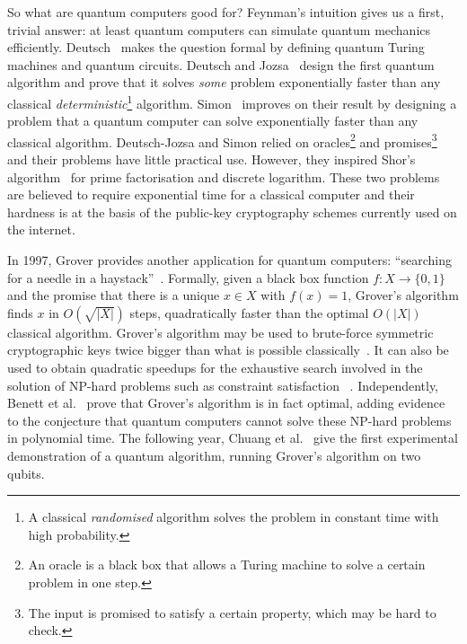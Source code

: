 So what are quantum computers good for? Feynman's intuition gives us a
first, trivial answer: at least quantum computers can simulate quantum
mechanics efficiently. Deutsch~\cite{Deutsch85a} makes the question formal by
defining quantum Turing machines and quantum circuits.
Deutsch and Jozsa~\cite{DeutschJozsa92}
design the first quantum algorithm and prove that it solves
\emph{some} problem exponentially faster than any classical
\emph{deterministic}\footnote
{A classical \emph{randomised} algorithm solves the
problem in constant time with high probability.} algorithm.
Simon~\cite{Simon94} improves on their result by designing a problem that a
quantum computer can solve exponentially faster than any classical
algorithm. Deutsch-Jozsa and Simon relied on
oracles\footnote{An oracle is
a black box that allows a Turing machine to solve a certain problem in one step.}
and promises\footnote
{The input is promised to satisfy a certain property, which may be hard to check.}
and their problems have little practical use. However, they inspired Shor's
algorithm~\cite{Shor94a} for prime factorisation and discrete logarithm. These
two problems are believed to require exponential time for a classical
computer and their hardness is at the basis of the public-key
cryptography schemes currently used on the internet.

In 1997, Grover provides another application for quantum computers:
``searching for a needle in a haystack''~\cite{Grover97}. Formally,
given a black box function $f : X \to \{0, 1\}$ and the promise that
there is a unique $x \in X$ with $f(x) = 1$, Grover's algorithm finds
$x$ in $O(\sqrt{|X|})$ steps, quadratically faster than the optimal
$O(|X|)$ classical algorithm. Grover's algorithm may be used to
brute-force symmetric cryptographic keys twice bigger than what is
possible classically~\cite{BernsteinEtAl09}. It can also be used to
obtain quadratic speedups for the exhaustive search involved in the
solution of NP-hard problems such as constraint satisfaction
~\cite{Ambainis04}. Independently, Benett et al.~\cite{BennettEtAl97}
prove that Grover's algorithm is in fact optimal, adding evidence to the
conjecture that quantum computers cannot solve these NP-hard problems in
polynomial time. The following year, Chuang et al.~\cite{ChuangEtAl98} give
the first experimental demonstration of a quantum algorithm, running
Grover's algorithm on two qubits.

